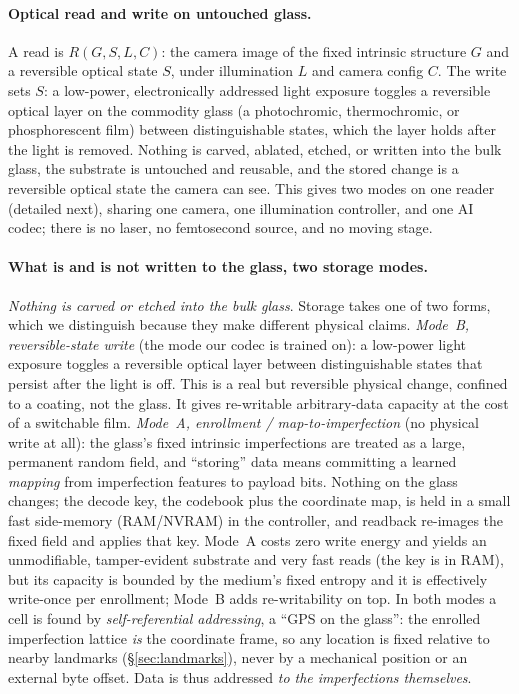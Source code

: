 \documentclass[letterpaper,twocolumn,10pt]{article}
\begin{document}
\paragraph{Optical read and write on untouched glass.} A read is $R(G,S,L,C)$: the camera
image of the fixed intrinsic structure $G$ and a reversible optical state $S$, under
illumination $L$ and camera config $C$. The write sets $S$: a low-power, electronically
addressed light exposure toggles a reversible optical layer on the commodity glass (a
photochromic, thermochromic, or phosphorescent film) between distinguishable states, which
the layer holds after the light is removed. Nothing is carved, ablated, etched, or written
into the bulk glass, the substrate is untouched and reusable, and the stored change is a
reversible optical state the camera can see. This gives two modes on one reader (detailed next), sharing one camera, one
illumination controller, and one AI codec; there is no laser, no femtosecond source, and no
moving stage.

\paragraph{What is and is not written to the glass, two storage modes.}
\emph{Nothing is carved or etched into the bulk glass}. Storage takes one of two forms,
which we distinguish because they make different physical claims.
\emph{Mode~B, reversible-state write} (the mode our codec is trained on): a low-power light
exposure toggles a reversible optical layer between distinguishable states that persist after
the light is off. This is a real but reversible physical change, confined to a coating, not
the glass. It gives re-writable arbitrary-data capacity at the cost of a switchable film.
\emph{Mode~A, enrollment / map-to-imperfection} (no physical write at all): the glass's
fixed intrinsic imperfections are treated as a large, permanent random field, and ``storing''
data means committing a learned \emph{mapping} from imperfection features to payload bits.
Nothing on the glass changes; the decode key, the codebook plus the coordinate map, is
held in a small fast side-memory (RAM/NVRAM) in the controller, and readback re-images the
fixed field and applies that key. Mode~A costs zero write energy and yields an unmodifiable,
tamper-evident substrate and very fast reads (the key is in RAM), but its capacity is bounded
by the medium's fixed entropy and it is effectively write-once per enrollment; Mode~B adds
re-writability on top. In both modes a cell is found by \emph{self-referential addressing}, a ``GPS on the glass'': the enrolled imperfection lattice \emph{is} the coordinate frame, so
any location is fixed relative to nearby landmarks (\S\ref{sec:landmarks}), never by a
mechanical position or an external byte offset. Data is thus addressed \emph{to the
imperfections themselves}.
\end{document}

